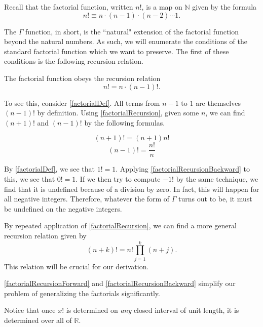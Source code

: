 \begin{defn}
Recall that the factorial function, written $n!$, is a map on $\mathbb{N}$ given by the formula
\begin{equation}\label{factorialDef}
    n! \equiv n \cdot (n-1) \cdot (n-2) \cdots 1.
\end{equation}
\end{defn}
The $\Gamma$ function, in short, is the ``natural" extension of the factorial function beyond the natural numbers.
As such, we will enumerate the conditions of the standard factorial function which we want to preserve.
The first of these conditions is the following recursion relation.

\begin{pro}
The factorial function obeys the recursion relation
\begin{equation}\label{factorialRecursion}
n! = n \cdot (n-1)!.
\end{equation}
\end{pro}

To see this, consider \eqref{factorialDef}.
All terms from $n-1$ to $1$ are themselves $(n-1)!$ by definition.
Using \eqref{factorialRecursion}, given some $n$, we can find $(n+1)!$ and $(n-1)!$ by the following formulas.

\begin{equation}\label{factorialRecursionForward}
(n+1)! = (n+1)n!
\end{equation}
\begin{equation}\label{factorialRecursionBackward}
(n-1)! = \frac{n!}{n}
\end{equation}

By \eqref{factorialDef}, we see that $1! = 1$. 
Applying \eqref{factorialRecursionBackward} to this, we see that $0! = 1$.
If we then try to compute $-1!$ by the same technique, we find that it is undefined because of a division by zero.
In fact, this will happen for all negative integers.
Therefore, whatever the form of $\Gamma$ turns out to be, it must be undefined on the negative integers.

By repeated application of \eqref{factorialRecursion}, we can find a more general recursion relation given by 
\begin{equation}\label{factorialSuperRecursion}
(n + k)! = n! \prod_{j=1}^k (n + j).
\end{equation}
This relation will be crucial for our derivation.

\eqref{factorialRecursionForward} and \eqref{factorialRecursionBackward} simplify our problem of generalizing the factorials significantly. 
\begin{obs}
Notice that once $x!$ is determined on \textit{any} closed interval of unit length, it is determined over all of $\mathbb{R}$.
\end{obs}

